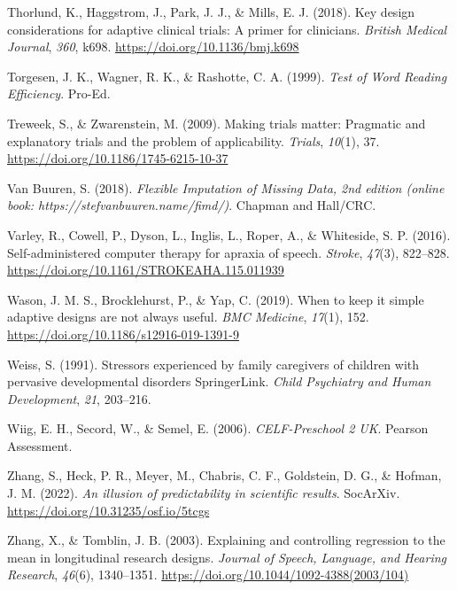 \documentclass{krantz}
\newlength{\cslhangindent}
\newlength{\cslentryspacingunit} %
\newenvironment{CSLReferences}[2] %
{%
\setlength{\parindent}{0pt}
\ifodd #1
\let\oldpar\par
\def\par{\hangindent=\cslhangindent\oldpar}
\fi
\setlength{\parskip}{#2\cslentryspacingunit}
}%
{}
\begin{document}
\begin{CSLReferences}{1}{0}
\leavevmode{}%
Thorlund, K., Haggstrom, J., Park, J. J., \& Mills, E. J. (2018). Key design considerations for adaptive clinical trials: A primer for clinicians. \emph{British Medical Journal}, \emph{360}, k698. \url{https://doi.org/10.1136/bmj.k698}

\leavevmode{}%
Torgesen, J. K., Wagner, R. K., \& Rashotte, C. A. (1999). \emph{Test of {Word Reading Efficiency}}. {Pro-Ed}.

\leavevmode{}%
Treweek, S., \& Zwarenstein, M. (2009). Making trials matter: Pragmatic and explanatory trials and the problem of applicability. \emph{Trials}, \emph{10}(1), 37. \url{https://doi.org/10.1186/1745-6215-10-37}

\leavevmode{}%
Van Buuren, S. (2018). \emph{Flexible {Imputation} of {Missing Data}, 2nd edition (online book: {https://stefvanbuuren.name/fimd/)}}. {Chapman and Hall/CRC}.

\leavevmode{}%
Varley, R., Cowell, P., Dyson, L., Inglis, L., Roper, A., \& Whiteside, S. P. (2016). Self-administered computer therapy for apraxia of speech. \emph{Stroke}, \emph{47}(3), 822--828. \url{https://doi.org/10.1161/STROKEAHA.115.011939}

\leavevmode{}%
Wason, J. M. S., Brocklehurst, P., \& Yap, C. (2019). When to keep it simple \textendash{} adaptive designs are not always useful. \emph{BMC Medicine}, \emph{17}(1), 152. \url{https://doi.org/10.1186/s12916-019-1391-9}

\leavevmode{}%
Weiss, S. (1991). Stressors experienced by family caregivers of children with pervasive developmental disorders \textbar{} {SpringerLink}. \emph{Child Psychiatry and Human Development}, \emph{21}, 203--216.

\leavevmode{}%
Wiig, E. H., Secord, W., \& Semel, E. (2006). \emph{{CELF-Preschool} 2 {UK}}. {Pearson Assessment}.

\leavevmode{}%
Zhang, S., Heck, P. R., Meyer, M., Chabris, C. F., Goldstein, D. G., \& Hofman, J. M. (2022). \emph{An illusion of predictability in scientific results}. {SocArXiv}. \url{https://doi.org/10.31235/osf.io/5tcgs}

\leavevmode{}%
Zhang, X., \& Tomblin, J. B. (2003). Explaining and controlling regression to the mean in longitudinal research designs. \emph{Journal of Speech, Language, and Hearing Research}, \emph{46}(6), 1340--1351. \url{https://doi.org/10.1044/1092-4388(2003/104)}

\end{CSLReferences}
\printindex
\end{document}
